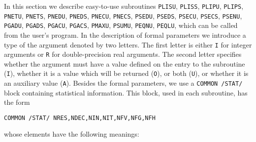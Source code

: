 \documentclass{esub2acm}
\begin{document}
\vspace{8mm}


\vspace{3mm}

\noindent In this section we describe easy-to-use subroutines
{\tt PLISU}, {\tt PLISS}, {\tt PLIPU}, {\tt PLIPS}, {\tt PNETU}, {\tt PNETS},
{\tt PNEDU}, {\tt PNEDS}, {\tt PNECU}, {\tt PNECS}, {\tt PSEDU}, {\tt PSEDS},
{\tt PSECU}, {\tt PSECS}, {\tt PSENU}, {\tt PGADU}, {\tt PGADS}, {\tt PGACU},
{\tt PGACS}, {\tt PMAXU}, {\tt PSUMU}, {\tt PEQNU}, {\tt PEQLU},
which can be called from the user's program. In the description of
formal parameters we introduce a type of the argument denoted by
two letters. The first letter is either {\tt I} for integer
arguments or {\tt R} for double-precision real arguments. The
second letter specifies whether the argument must have a value
defined on the entry to the subroutine ({\tt I}), whether it is a
value which will be returned ({\tt O}), or both ({\tt U}), or
whether it is an auxiliary value ({\tt A}).
Besides the formal parameters, we use a {\tt COMMON /STAT/} block
containing statistical information. This block, used in each
subroutine, has the form
\begin{verbatim}
COMMON /STAT/ NRES,NDEC,NIN,NIT,NFV,NFG,NFH
\end{verbatim}
whose elements have the following meanings:

\vspace{3mm}

\small
\end{document}
